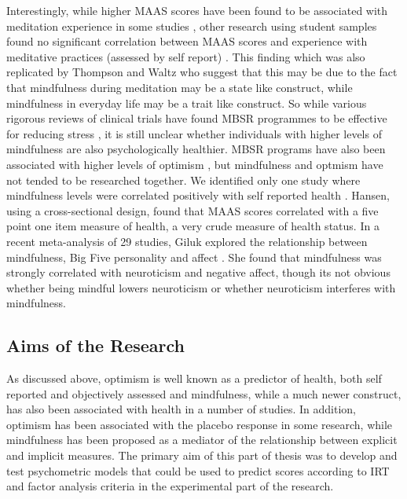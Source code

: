 \documentclass{article}
\begin{document}
 Interestingly, while higher MAAS scores have been found to be associated with meditation experience in some 
studies \cite{brown2003benefits}, other research using student samples found no significant correlation between 
MAAS scores and experience with meditative practices (assessed by self report) \cite{MacKillop2007} . This finding which
 was also replicated by Thompson and Waltz \cite{thompson2007everyday}  who suggest that this may be due to the fact that 
mindfulness during meditation may be a state like construct, while mindfulness in everyday life may be a trait like construct. 
So while various rigorous reviews of clinical trials have found MBSR programmes to be effective for
 reducing stress \cite{Chiesa2009,praissman2008mindfulness} , it is still unclear whether individuals 
with higher levels of mindfulness are also psychologically healthier.
 MBSR programs have also been associated with higher levels of optimism
 \cite{Carson2004}, but mindfulness and optmism have not tended to be researched together. 
We identified only one study where mindfulness levels were correlated positively 
with self reported health \cite{Hansen2009}. Hansen, using a cross-sectional design, 
found that MAAS scores correlated with a five point one item measure of health,   
a very crude measure of health status. In a recent meta-analysis of 29 studies, 
Giluk explored the relationship between mindfulness, Big Five personality and affect \cite{giluk2009mindfulness}.
She found that mindfulness was strongly correlated with neuroticism and negative affect,
 though its not obvious whether being mindful lowers neuroticism or 
 whether neuroticism interferes with mindfulness. 


\subsection{Aims of the Research}

As discussed above, optimism is well known as a predictor of health, both self reported and objectively assessed and mindfulness, while a much newer construct, has also been associated with health in a number of studies.  In addition, optimism has been associated with the placebo response in some research, while mindfulness has been proposed as a mediator of the relationship between explicit and implicit measures.
The primary aim of this part of thesis was to develop and test psychometric models that could be used to predict scores according to IRT and factor analysis criteria in the experimental part of the research.
\end{document}

